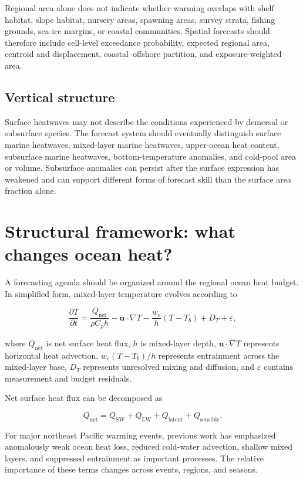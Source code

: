 \documentclass[11pt]{article}
\newcommand{\MHWs}{marine heatwaves}
\begin{document}
Regional area alone does not indicate whether warming overlaps with shelf habitat, slope habitat, nursery areas, spawning areas, survey strata, fishing grounds, sea-ice margins, or coastal communities. Spatial forecasts should therefore include cell-level exceedance probability, expected regional area, centroid and displacement, coastal--offshore partition, and exposure-weighted area.

\subsection{Vertical structure}

Surface heatwaves may not describe the conditions experienced by demersal or subsurface species. The forecast system should eventually distinguish surface \MHWs{}, mixed-layer \MHWs{}, upper-ocean heat content, subsurface \MHWs{}, bottom-temperature anomalies, and cold-pool area or volume. Subsurface anomalies can persist after the surface expression has weakened and can support different forms of forecast skill than the surface area fraction alone.

\section{Structural framework: what changes ocean heat?}

A forecasting agenda should be organized around the regional ocean heat budget. In simplified form, mixed-layer temperature evolves according to

\begin{equation}
\frac{\partial T}{\partial t}
=
\frac{Q_{\mathrm{net}}}{\rho C_p h}
-
\mathbf{u}\cdot\nabla T
-
\frac{w_e}{h}(T-T_b)
+
D_T
+
\varepsilon,
\end{equation}

where $Q_{\mathrm{net}}$ is net surface heat flux, $h$ is mixed-layer depth, $\mathbf{u}\cdot\nabla T$ represents horizontal heat advection, $w_e(T-T_b)/h$ represents entrainment across the mixed-layer base, $D_T$ represents unresolved mixing and diffusion, and $\varepsilon$ contains measurement and budget residuals.

Net surface heat flux can be decomposed as

\begin{equation}
Q_{\mathrm{net}}
=
Q_{\mathrm{SW}}
+
Q_{\mathrm{LW}}
+
Q_{\mathrm{latent}}
+
Q_{\mathrm{sensible}}.
\end{equation}

For major northeast Pacific warming events, previous work has emphasized anomalously weak ocean heat loss, reduced cold-water advection, shallow mixed layers, and suppressed entrainment as important processes. The relative importance of these terms changes across events, regions, and seasons.
\end{document}
